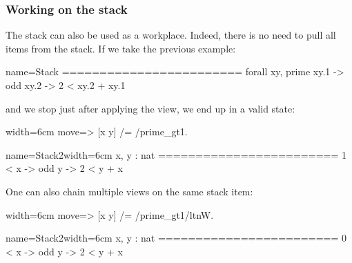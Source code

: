 %

\subsubsection{Working on the stack}

The stack can also be used as a workplace.  Indeed, there is no need
to pull all items from the stack.  If we take the previous example:

\begin{coqout}{name=Stack}{}
========================
forall xy, prime xy.1 -> odd xy.2 -> 2 < xy.2 + xy.1
\end{coqout}
and we stop just after applying the view, we end up in a valid state:

\begin{coq-left}{}{width=6cm}
move=> [x y] /= /prime_gt1.
$~$
$~$
\end{coq-left}
\begin{coqout-right}{name=Stack2}{width=6cm}
 x, y : nat
 ========================
 1 < x -> odd y -> 2 < y + x
\end{coqout-right}

One can also chain multiple views on the same stack item:

\begin{coq-left}{}{width=6cm}
move=> [x y] /= /prime_gt1/ltnW.
$~$
$~$
\end{coq-left}
\begin{coqout-right}{name=Stack2}{width=6cm}
 x, y : nat
 ========================
 0 < x -> odd y -> 2 < y + x
\end{coqout-right}

